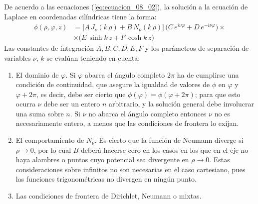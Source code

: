De acuerdo a las ecuaciones (\ref{eq:ecuacion_08_02}), la solución a la ecuación de Laplace en coordenadas cilíndricas tiene la forma:
\begin{align*}
\phi (\rho, \varphi, z) &= \bigg[ A \, J_{\nu} (k \, \rho) + B \, N_{\nu} (k \, \rho) \bigg] \, \big( C \, e^{i \nu \varphi} + D \, e^{-i \nu \varphi} \big) \times \\[0.5em]
&\times \big( E \, \sinh k \, z + F \,  \cosh k \, z \big)
\end{align*}
Las constantes de integración $A, B, C, D, E, F$ y los parámetros de separación de variables $\nu$, $k$ se evalúan teniendo en cuenta:
\begin{enumerate}[label=\textbf{\Alph*})]
\item El dominio de $\varphi$. Si $\varphi$ abarca el ángulo completo $2 \pi$ ha de cumplirse una condición de continuidad, que asegure la igualdad de valores de $\phi$ en $\varphi$ y $\varphi + 2 \pi$, es decir, debe ser cierto que $\phi (\varphi) = \phi (\varphi + 2 \pi)$; para que esto ocurra $\nu$ debe ser un entero $n$ arbitrario, y la solución general debe involucrar una suma sobre $n$. Si $\nu$ no abarca el ángulo completo entonces $\nu$ no es necesariamente entero, a menos que las condiciones de frontera lo exijan.
\item El comportamiento de $N_{\nu}$. Es cierto que la función de Neumann diverge si $\rho \to 0$, por lo cual $B$ deberá hacerse cero en los casos en los que en el eje no haya alambres o puntos cuyo potencial sea divergente en $\rho \to 0$. Estas consideraciones sobre infinitos no son necesarias en el caso cartesiano, pues las funciones trigonométricas no divergen en ningún punto.
\item Las condiciones de frontera de Dirichlet, Neumann o mixtas.
\end{enumerate}


